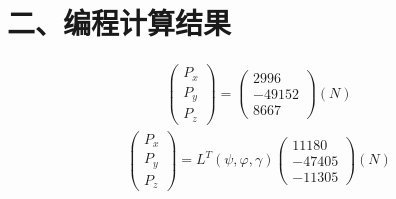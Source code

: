 \documentclass[UTF8]{ctexart}
\begin{document}
\section*{ 二、编程计算结果}

\begin{align}
    \begin{pmatrix}
        P_{x} \\
        P_{y} \\
        P_{z}
    \end{pmatrix}
    =
    \begin{pmatrix}
        2996   \\
        -49152 \\
        8667
    \end{pmatrix}
    \left(N\right)
\end{align}
\begin{align}
    \begin{pmatrix}
        P_{x} \\
        P_{y} \\
        P_{z}
    \end{pmatrix}
    =
    L^{T} \left(\psi , \varphi , \gamma\right)
    \begin{pmatrix}
        11180  \\
        -47405 \\
        -11305
    \end{pmatrix}
    \left(N\right)
\end{align}


\clearpage


\clearpage


\end{document}
